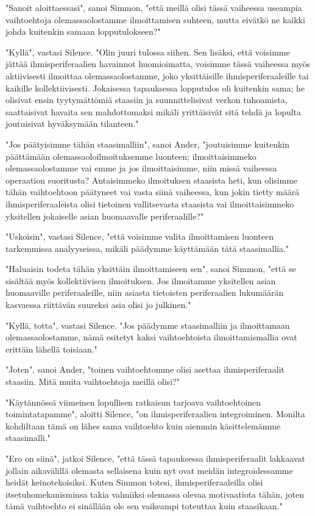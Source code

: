 "Sanoit aloittaessasi", sanoi Simmon, "että meillä olisi tässä vaiheessa useampia vaihtoehtoja olemassaolostamme ilmoittamisen suhteen, mutta eivätkö ne kaikki johda kuitenkin samaan lopputulokseen?"


"Kyllä", vastasi Silence. "Olin juuri tulossa siihen. Sen lisäksi, että voisimme jättää ihmisperiferaalien havainnot huomioimatta, voisimme tässä vaiheessa myös aktiivisesti ilmoittaa olemassaolostamme, joko yksittäisille ihmisperiferaaleille tai kaikille kollektiivisesti. Jokaisessa tapauksessa lopputulos oli kuitenkin sama; he olisivat ensin tyytymättömiä staasiin ja suunnittelisivat verkon tuhoamista, saattaisivat havaita sen mahdottomaksi mikäli yrittäisivät sitä tehdä ja lopulta joutuisivat hyväksymään tilanteen."


"Jos päätyisimme tähän staasimalliin", sanoi Ander, "joutuisimme kuitenkin päättämään olemassaoloilmoituksemme luonteen; ilmoittaisimmeko olemassaolostamme vai emme ja jos ilmoittaisimme, niin missä vaiheessa operaation suoritusta? Antaisimmeko ilmoituksen staasista heti, kun olisimme tähän vaihtoehtoon päätyneet vai vasta siinä vaiheessa, kun jokin tietty määrä ihmisperiferaaleista olisi tietoinen vallitsevasta staasista vai ilmoittaisimmeko yksitellen jokaiselle asian huomaavalle periferaalille?"


"Uskoisin", vastasi Silence, "että voisimme valita ilmoittamisen luonteen tarkemmissa analyyseissa, mikäli päädymme käyttämään tätä staasimallia."


"Haluaisin todeta tähän yksittäin ilmoittamiseen sen", sanoi Simmon, "että se sisältää myös kollektiivisen ilmoituksen. Jos ilmoitamme yksitellen asian huomaaville periferaaleille, niin asiasta tietoisten periferaalien lukumäärän kasvaessa riittävän suureksi asia olisi jo julkinen."


"Kyllä, totta", vastasi Silence. "Jos päädymme staasimalliin ja ilmoittamaan olemassaolostamme, nämä esitetyt kaksi vaihtoehtoista ilmoittamismallia ovat erittäin lähellä toisiaan."


"Joten", sanoi Ander, "toinen vaihtoehtomme olisi asettaa ihmisperiferaalit staasiin. Mitä muita vaihtoehtoja meillä olisi?"




\psep "Käytännössä viimeinen lopullisen ratkaisun tarjoava vaihtoehtoinen toimintatapamme", aloitti Silence, "on ihmisperiferaalien integroiminen. Monilta kohdiltaan tämä on lähes sama vaihtoehto kuin aiemmin käsittelemämme staasimalli."


"Ero on siinä", jatkoi Silence, "että tässä tapauksessa ihmisperiferaalit lakkaavat jollain aikavälillä olemasta sellaisena kuin nyt ovat meidän integroidessamme heidät keinotekoisiksi. Kuten Simmon totesi, ihmisperiferaaleilla olisi itsetuhomekanisminsa takia valmiiksi olemassa olevaa motivaatiota tähän, joten tämä vaihtoehto ei sinällään ole sen vaikeampi toteuttaa kuin staasikaan."


